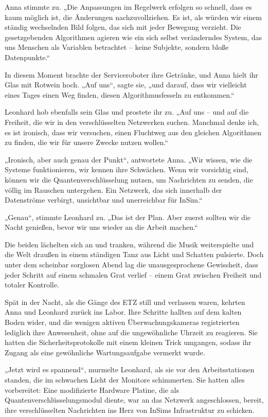 \documentclass[
]{article}
\begin{document}
Anna stimmte zu. „Die Anpassungen im Regelwerk erfolgen so schnell, dass
es kaum möglich ist, die Änderungen nachzuvollziehen. Es ist, als würden
wir einem ständig wechselnden Bild folgen, das sich mit jeder Bewegung
verzieht. Die gesetzgebenden Algorithmen agieren wie ein sich selbst
veränderndes System, das uns Menschen als Variablen betrachtet -- keine
Subjekte, sondern bloße Datenpunkte.``

In diesem Moment brachte der Serviceroboter ihre Getränke, und Anna
hielt ihr Glas mit Rotwein hoch. „Auf uns``, sagte sie, „und darauf,
dass wir vielleicht eines Tages einen Weg finden, diesen
Algorithmusfesseln zu entkommen.``

Leonhard hob ebenfalls sein Glas und prostete ihr zu. „Auf uns -- und
auf die Freiheit, die wir in den verschlüsselten Netzwerken suchen.
Manchmal denke ich, es ist ironisch, dass wir versuchen, einen Fluchtweg
aus den gleichen Algorithmen zu finden, die wir für unsere Zwecke nutzen
wollen.``

„Ironisch, aber auch genau der Punkt``, antwortete Anna. „Wir wissen,
wie die Systeme funktionieren, wir kennen ihre Schwächen. Wenn wir
vorsichtig sind, können wir die Quantenverschlüsselung nutzen, um
Nachrichten zu senden, die völlig im Rauschen untergehen. Ein Netzwerk,
das sich innerhalb der Datenströme verbirgt, unsichtbar und unerreichbar
für InSim.``

„Genau``, stimmte Leonhard zu. „Das ist der Plan. Aber zuerst sollten
wir die Nacht genießen, bevor wir uns wieder an die Arbeit machen.``

Die beiden lächelten sich an und tranken, während die Musik
weiterspielte und die Welt draußen in einem ständigen Tanz aus Licht und
Schatten pulsierte. Doch unter dem scheinbar sorglosen Abend lag die
unausgesprochene Gewissheit, dass jeder Schritt auf einem schmalen Grat
verlief -- einem Grat zwischen Freiheit und totaler Kontrolle.

Spät in der Nacht, als die Gänge des ETZ still und verlassen waren,
kehrten Anna und Leonhard zurück ins Labor. Ihre Schritte hallten auf
dem kalten Boden wider, und die wenigen aktiven Überwachungskameras
registrierten lediglich ihre Anwesenheit, ohne auf die ungewöhnliche
Uhrzeit zu reagieren. Sie hatten die Sicherheitsprotokolle mit einem
kleinen Trick umgangen, sodass ihr Zugang als eine gewöhnliche
Wartungsaufgabe vermerkt wurde.

„Jetzt wird es spannend``, murmelte Leonhard, als sie vor den
Arbeitsstationen standen, die im schwachen Licht der Monitore
schimmerten. Sie hatten alles vorbereitet: Eine modifizierte Hardware
Platine, die als Quantenverschlüsselungsmodul diente, war an das
Netzwerk angeschlossen, bereit, ihre verschlüsselten Nachrichten ins
Herz von InSims Infrastruktur zu schicken.
\end{document}
